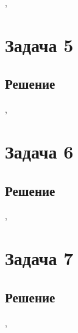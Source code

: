 \documentclass[a4paper,12pt]{article}
\begin{document}
	\sep	
	
	\section*{Задача 5}
	
	\subsection*{Решение}
	
	

	\sep	
		
		
	\section*{Задача 6}

	
	\subsection*{Решение}
	


	\sep		
	
	
	
	
	\section*{Задача 7}

	
	\subsection*{Решение}
	


	\sep	
	
	
	
	
\end{document}
